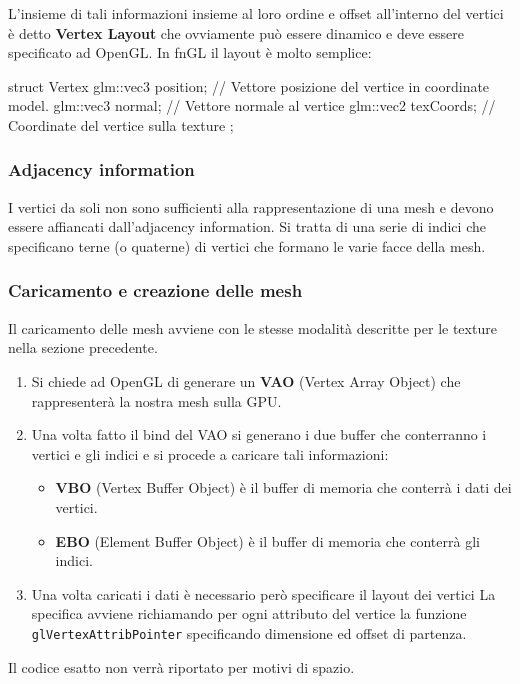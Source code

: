 L'insieme di tali informazioni insieme al loro ordine e offset all'interno del vertici è detto \textbf{Vertex Layout} che ovviamente può essere dinamico e deve essere specificato ad OpenGL. In fnGL il layout è molto semplice:
\begin{cpp}[caption={Nel vertice si memorizzano la posizione in coordinate model, la normale al vertice per l'illuminazione e le coordinate texure per appunto applicare la texture.}, captionpos=t]
struct Vertex{
	glm::vec3 position;    // Vettore posizione del vertice in coordinate model.
	glm::vec3 normal;      // Vettore normale al vertice
	glm::vec2 texCoords;   // Coordinate del vertice sulla texture
};
\end{cpp}

\subsubsection{Adjacency information}
I vertici da soli non sono sufficienti alla rappresentazione di una mesh e devono essere affiancati dall'{}adjacency information. Si tratta di una serie di indici che specificano terne (o quaterne) di vertici che formano le varie facce della mesh. 


\subsubsection{Caricamento e creazione delle mesh}
Il caricamento delle mesh avviene con le stesse modalità descritte per le texture nella sezione precedente. 
\begin{enumerate}
\item Si chiede ad OpenGL di generare un \textbf{VAO} (Vertex Array Object) che rappresenterà la nostra mesh sulla GPU.
\item Una volta fatto il bind del VAO si generano i due buffer che conterranno i vertici e gli indici e si procede a caricare tali informazioni:
\begin{itemize}
	\item \textbf{VBO} (Vertex Buffer Object) è il buffer di memoria che conterrà i dati dei vertici.
	\item \textbf{EBO} (Element Buffer Object) è il buffer di memoria che conterrà gli indici.
\end{itemize}
\item Una volta caricati i dati è necessario però specificare il layout dei vertici
La specifica avviene richiamando per ogni attributo del vertice la funzione \texttt{glVertexAttribPointer} specificando dimensione ed offset di partenza.
\end{enumerate}
Il codice esatto non verrà riportato per motivi di spazio.

